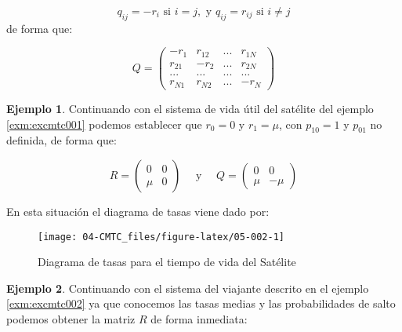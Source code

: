 \documentclass[
]{book}
\theoremstyle{definition}
\theoremstyle{definition}
\newtheorem{example}{Ejemplo}[chapter]
\theoremstyle{definition}
\theoremstyle{definition}
\theoremstyle{remark}
\begin{document}
\[q_{ij} = -r_i \text{ si } i = j, \text{ y } q_{ij} = r_{ij} \text{ si } i \neq j\] de forma que:

\[Q = 
\begin{pmatrix}
-r_1 & r_{12} & ... & r_{1N}\\
r_{21} & -r_2 & ... & r_{2N}\\
... & ... & ... & ...\\
r_{N1} & r_{N2} & ... & -r_N
\end{pmatrix}\]

\begin{example}
\protect\hypertarget{exm:excmtc003}{}\label{exm:excmtc003}Continuando con el sistema de vida útil del satélite del ejemplo \ref{exm:excmtc001} podemos establecer que \(r_0 = 0\) y \(r_1 = \mu\), con \(p_{10} = 1\) y \(p_{01}\) no definida, de forma que:
\end{example}

\[R = 
\begin{pmatrix}
0 & 0 \\
\mu & 0
\end{pmatrix} \quad \text{ y } \quad Q = 
\begin{pmatrix}
0 & 0 \\
\mu & -\mu
\end{pmatrix}\]

En esta situación el diagrama de tasas viene dado por:

\begin{figure}

{\centering \texttt{[image: 04-CMTC\_files/figure-latex/05-002-1]} 

}

\caption{Diagrama de tasas para el tiempo de vida del Satélite}\label{fig:05-002}
\end{figure}

\begin{example}
\protect\hypertarget{exm:excmtc004}{}\label{exm:excmtc004}Continuando con el sistema del viajante descrito en el ejemplo \ref{exm:excmtc002} ya que conocemos las tasas medias y las probabilidades de salto podemos obtener la matriz \(R\) de forma inmediata:
\end{example}
\end{document}
